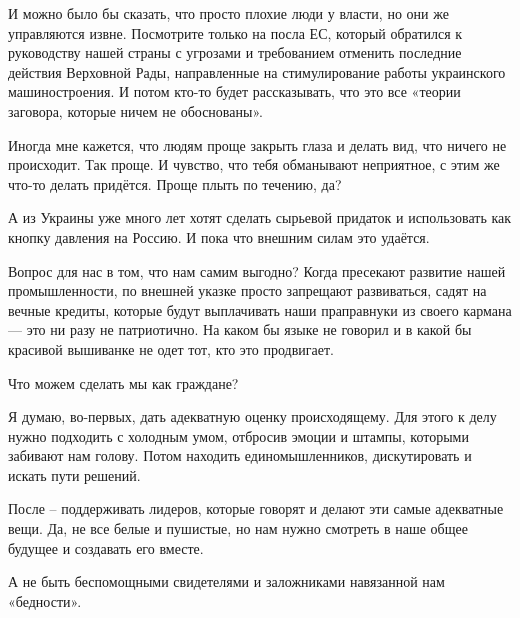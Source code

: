 И можно было бы сказать, что просто плохие люди у власти, но они же управляются
извне. Посмотрите только на посла ЕС, который обратился к руководству нашей
страны с угрозами и требованием отменить последние действия Верховной Рады,
направленные на стимулирование работы украинского машиностроения. И потом
кто-то будет рассказывать, что это все «теории заговора, которые ничем не
обоснованы». 

Иногда мне кажется, что людям проще закрыть глаза и делать вид, что ничего не
происходит. Так проще. И чувство, что тебя обманывают неприятное, с этим же
что-то делать придётся. Проще плыть по течению, да? 

А из Украины уже много лет хотят сделать сырьевой придаток и использовать как
кнопку давления на Россию. И пока что внешним силам это удаётся. 

Вопрос для нас в том, что нам самим выгодно? Когда пресекают развитие нашей
промышленности, по внешней указке просто запрещают развиваться, садят на вечные
кредиты, которые будут выплачивать наши праправнуки из своего кармана — это ни
разу не патриотично. На каком бы языке не говорил и в какой бы красивой
вышиванке не одет тот, кто это продвигает. 

Что можем сделать мы как граждане?

Я думаю, во-первых, дать адекватную оценку происходящему. Для этого к делу
нужно подходить с холодным умом, отбросив эмоции и штампы, которыми забивают
нам голову. Потом находить единомышленников, дискутировать и искать пути
решений. 

После – поддерживать лидеров, которые говорят и делают эти самые адекватные
вещи. Да, не все белые и пушистые, но нам нужно смотреть в наше общее будущее и
создавать его вместе. 

А не быть беспомощными свидетелями и заложниками навязанной нам «бедности».
